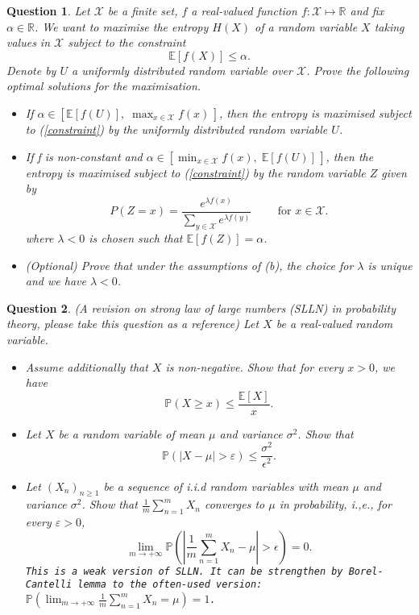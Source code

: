 \documentclass[11pt]{article}
\newtheorem{qu}{Question }
\newcommand{\calX}{{\mathcal X}}
\newcommand{\R}{{\mathbb R}}
\newcommand{\E}{{\mathbb E}}
\renewcommand{\P}{{\mathbb P}}
\begin{document}
\begin{qu}
\rm
Let $\calX$ be a finite set, $f$ a real-valued function $f: \calX\mapsto \R$ and fix $\alpha\in \R$. 
We want to maximise the entropy $H (X)$ of a random variable $X$ taking values in $\calX$ subject to the constraint
\begin{equation}\label{constraint}
\E[f (X)] \le \alpha.
\end{equation}
Denote by $U$  a uniformly distributed random variable over $\calX$. Prove the following optimal solutions for the maximisation.
\begin{itemize}
\item [(a)] If $\alpha\in [\E[f(U)], \; \max_{x\in\calX} f (x)\,]$, then the entropy is maximised subject to (\ref{constraint}) by the uniformly distributed random variable $U$.

\item [(b)]  If f is non-constant and  $\alpha\in [\min_{x\in\calX} f(x),  \; \E[f (U)]\, ]$, then the entropy 
is maximised subject to (\ref{constraint}) by the random variable $Z$ given by
$$P(Z = x) =\frac{e^{\lambda f(x)}}{\sum_{y\in\calX} e^{\lambda f(y)}} \qquad \mbox{ for } x\in\calX.$$
where $\lambda < 0$ is chosen such that $\E[ f (Z)] = \alpha$.

\item [(c)] (Optional) Prove that under the assumptions of (b), the choice for $\lambda$ is unique and we have
$\lambda < 0$.
\end{itemize}
\end{qu}


\bigskip
\bigskip


\begin{qu}\rm
(A revision on  strong law of large numbers (SLLN) in probability theory, please take this question as a reference)
Let $X$ be a real-valued random variable.
\begin{itemize}
\item [(a)] Assume additionally that $X$ is non-negative. Show that for every $x > 0$, we have
$$\P(X\ge x)\le \frac{\E[X]}{x}.$$
\item [(b)] Let $X$ be a random variable of mean $\mu$ and variance $\sigma^2$. Show that 
$$\P(|X-\mu|>\varepsilon)\le \frac{\sigma^2}{\epsilon^2}.$$
\item [(c)] Let $(X_n)_{n\ge 1}$ be a sequence of i.i.d  random variables with mean $\mu$ and variance $\sigma^2$. Show that $\frac{1}{m}\sum_{n=1}^m X_n$ converges to $\mu$ in probability, i.,e., for every $\varepsilon > 0$, 
$$\lim_{m\rightarrow +\infty} \P\left(\left|\frac{1}{m}\sum_{n=1}^m X_n-\mu\right|>\epsilon\right)=0.$$
{\tt This is a weak version of SLLN. It can be strengthen by Borel-Cantelli lemma to the often-used version: $\P(\lim_{m\rightarrow +\infty} \frac{1}{m}\sum_{n=1}^m X_n=\mu)=1$. }

\end{itemize}

\end{qu}
\end{document}
